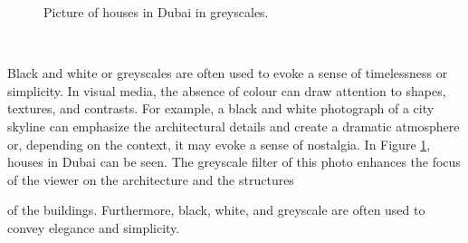 \documentclass[../MasterThesis.tex]{subfiles}
\begin{document}
\begin{minipage}{0.5\textwidth}
	\begin{figure}[H]
	\begin{center}
		\caption[Picture of a houses in Dubai in greyscales.]{Picture of houses in Dubai in greyscales.}
		\label{figure:gray}
	\end{center}
\end{figure}\hfill
\end{minipage}\begin{minipage}{0.05\textwidth}
	\ 
\end{minipage}\begin{minipage}{0.45\textwidth}
	Black and white or greyscales are often used to evoke a sense of timelessness or simplicity. In visual media, the absence of colour can draw attention to shapes, textures, and contrasts. For example, a black and white photograph of a city skyline can emphasize the architectural details and create a dramatic atmosphere or, depending on the context, it may evoke a sense of nostalgia.
	In Figure \ref{figure:gray}, houses in Dubai can be seen. The greyscale filter of this photo enhances the focus of the viewer on the architecture and the structures

	
\end{minipage}

\vspace*{-0.6em}
 of the buildings. Furthermore, black, white, and greyscale are often used to convey elegance and simplicity.~\cite{colour2}


%














	
	
	
	
\end{document}

